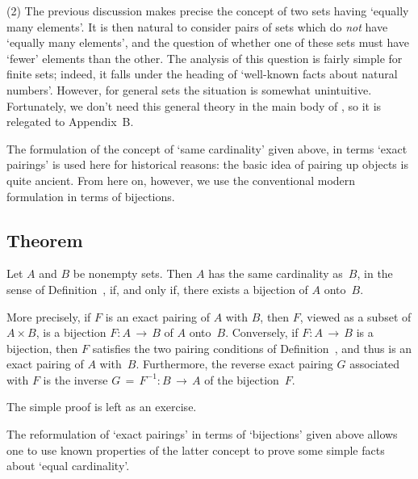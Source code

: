 \V

        (2) The previous discussion makes precise the concept of two sets having `equally many elements'.
    It is then natural to consider pairs of sets which do {\em not} have `equally many elements',
    and the question of whether one of these sets must have `fewer' elements than the other.
    The analysis of this question is fairly simple for finite sets; indeed, it falls under the heading of `well-known facts about natural numbers'.
    However, for general sets the situation is somewhat unintuitive. Fortunately, we don't need this general theory in the main body of {\ThisText},
    so it is relegated to Appendix~B.

\VV

        The formulation of the concept of `same cardinality' given above, in terms `exact pairings' is used here for historical reasons:
    the basic idea of pairing up objects is quite ancient. From here on, however, we use the conventional modern formulation in terms of bijections.
    

\V

        \subsection{\small{{\bf Theorem}}}
        \label{ThmA30.55}

\V

        Let $A$ and $B$ be nonempty sets. Then $A$ has the same cardinality as~$B$,
    in the sense of Definition~, if, and only if, there exists a bijection of $A$ onto~$B$.

        More precisely, if $F$ is an exact pairing of $A$ with $B$, then $F$, viewed as a subset of $A{\times}B$,
    is a bijection $F:A \,{\rightarrow}\, B$ of $A$ onto~$B$. Conversely, if $F:A \,{\rightarrow}\, B$ is a bijection,
    then $F$ satisfies the two pairing conditions of Definition~, and thus is an exact pairing of $A$ with~$B$.
    Furthermore, the reverse exact pairing $G$ associated with $F$ is the inverse $G \,=\, F^{-1}:B \,{\rightarrow}\, A$ of the bijection~$F$.

\V

        The simple proof is left as an exercise. %

\VV


        The reformulation of `exact pairings' in terms of `bijections' given above
    allows one to use known properties of the latter concept to prove some simple facts about `equal cardinality'.


